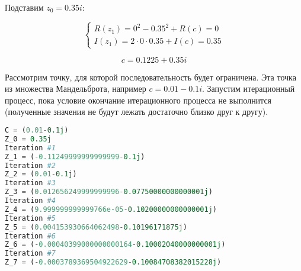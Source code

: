 Подставим $z_{0} = 0.35i$:

\begin{equation*}
 \begin{cases}
   R(z_{1}) = 0^{2} - 0.35^{2} + R(c) = 0
   \\
   I(z_{1}) = 2 \cdot 0 \cdot 0.35 + I(c) = 0.35
 \end{cases}
\end{equation*}

$$
c = 0.1225 + 0.35i
$$

Рассмотрим точку, для которой последовательность будет ограничена. Эта точка из множества Мандельброта, например $c = 0.01 - 0.1i$. Запустим итерационный процесс, пока условие окончание итерационного процесса не выполнится (полученные значения не будут лежать достаточно близко друг к другу).

\begin{lstlisting}[language=Python]
C = (0.01-0.1j)
Z_0 = 0.35j
Iteration #1
Z_1 = (-0.11249999999999999-0.1j)
Iteration #2
Z_2 = (0.01-0.1j)
Iteration #3
Z_3 = (0.012656249999999996-0.07750000000000001j)
Iteration #4
Z_4 = (9.999999999999766e-05-0.10200000000000001j)
Iteration #5
Z_5 = (0.004153930664062498-0.10196171875j)
Iteration #6
Z_6 = (-0.00040399000000000164-0.10002040000000001j)
Iteration #7
Z_7 = (-0.0003789369504922629-0.10084708382015228j)
\end{lstlisting}

\pagebreak

